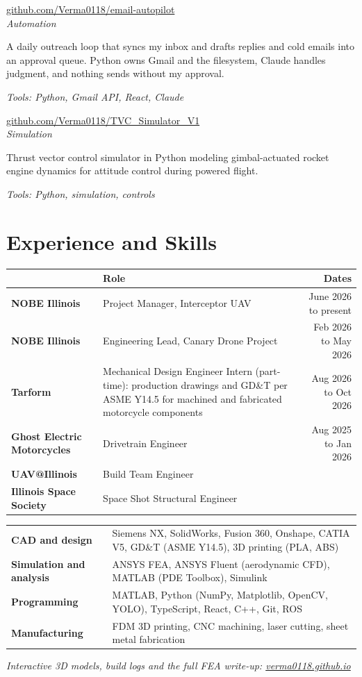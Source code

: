 \documentclass[11pt]{article}
\newcommand{\project}[3]{%
  \par\noindent{\bfseries #1}\hfill{\small #2}\\
  {\itshape #3}\par\vspace{0.2em}}
\newcommand{\tools}[1]{\par{\small\itshape Tools: #1}\par}
\begin{document}
\project{EmailCRM Autopilot}{\href{https://github.com/Verma0118/email-autopilot}{github.com/Verma0118/email-autopilot}}{Automation}
A daily outreach loop that syncs my inbox and drafts replies and cold emails
into an approval queue. Python owns Gmail and the filesystem, Claude handles
judgment, and nothing sends without my approval.
\tools{Python, Gmail API, React, Claude}

\project{TVC Simulator}{\href{https://github.com/Verma0118/TVC_Simulator_V1}{github.com/Verma0118/TVC\_Simulator\_V1}}{Simulation}
Thrust vector control simulator in Python modeling gimbal-actuated rocket
engine dynamics for attitude control during powered flight.
\tools{Python, simulation, controls}

\section{Experience and Skills}

\begin{table}[H]
  \centering
  \small
  \begin{tabularx}{\textwidth}{@{}>{\bfseries}l X r@{}}
    \toprule
    \multicolumn{1}{@{}l}{Organization} & Role & Dates \\
    \midrule
    NOBE Illinois & Project Manager, Interceptor UAV & June 2026 to present \\
    NOBE Illinois & Engineering Lead, Canary Drone Project & Feb 2026 to May 2026 \\
    Tarform & Mechanical Design Engineer Intern (part-time): production
      drawings and GD\&T per ASME Y14.5 for machined and fabricated
      motorcycle components & Aug 2026 to Oct 2026 \\
    Ghost Electric Motorcycles & Drivetrain Engineer & Aug 2025 to Jan 2026 \\
    UAV@Illinois & Build Team Engineer & \\
    Illinois Space Society & Space Shot Structural Engineer & \\
    \bottomrule
  \end{tabularx}
\end{table}

\begin{table}[H]
  \centering
  \small
  \begin{tabularx}{\textwidth}{@{}>{\bfseries}l X@{}}
    \toprule
    CAD and design & Siemens NX, SolidWorks, Fusion 360, Onshape, CATIA V5, GD\&T (ASME Y14.5), 3D printing (PLA, ABS) \\
    Simulation and analysis & ANSYS FEA, ANSYS Fluent (aerodynamic CFD), MATLAB (PDE Toolbox), Simulink \\
    Programming & MATLAB, Python (NumPy, Matplotlib, OpenCV, YOLO), TypeScript, React, C++, Git, ROS \\
    Manufacturing & FDM 3D printing, CNC machining, laser cutting, sheet metal fabrication \\
    \bottomrule
  \end{tabularx}
\end{table}

\vfill
\begin{center}\small\itshape
Interactive 3D models, build logs and the full FEA write-up:
\href{https://verma0118.github.io}{verma0118.github.io}
\end{center}
\end{document}
